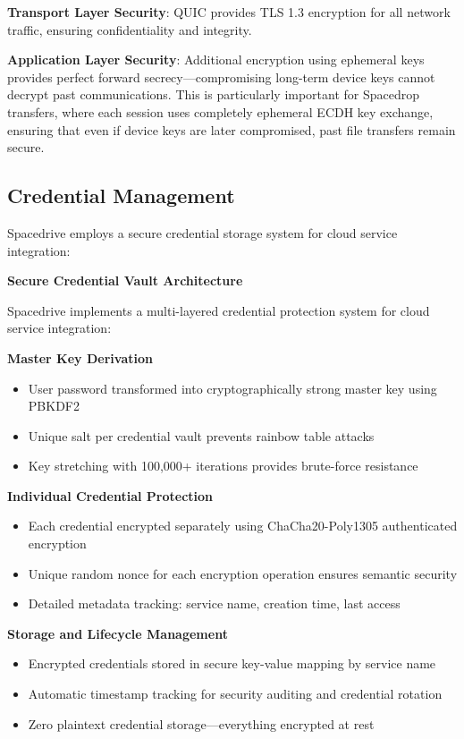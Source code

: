 \documentclass[sigconf]{acmart}
\begin{document}
\textbf{Transport Layer Security}: QUIC provides TLS 1.3 encryption for all network traffic, ensuring confidentiality and integrity.

\textbf{Application Layer Security}: Additional encryption using ephemeral keys provides perfect forward secrecy---compromising long-term device keys cannot decrypt past communications. This is particularly important for Spacedrop transfers, where each session uses completely ephemeral ECDH key exchange, ensuring that even if device keys are later compromised, past file transfers remain secure.

\subsection{Credential Management}
Spacedrive employs a secure credential storage system for cloud service integration:


\textbf{Secure Credential Vault Architecture}

Spacedrive implements a multi-layered credential protection system for cloud service integration:

\textbf{Master Key Derivation}
\begin{itemize}[noitemsep, topsep=0pt]
 \item User password transformed into cryptographically strong master key using PBKDF2
 \item Unique salt per credential vault prevents rainbow table attacks
 \item Key stretching with 100,000+ iterations provides brute-force resistance
\end{itemize}

\textbf{Individual Credential Protection}
\begin{itemize}[noitemsep, topsep=0pt]
 \item Each credential encrypted separately using ChaCha20-Poly1305 authenticated encryption
 \item Unique random nonce for each encryption operation ensures semantic security
 \item Detailed metadata tracking: service name, creation time, last access
\end{itemize}

\textbf{Storage and Lifecycle Management}
\begin{itemize}[noitemsep, topsep=0pt]
 \item Encrypted credentials stored in secure key-value mapping by service name
 \item Automatic timestamp tracking for security auditing and credential rotation
 \item Zero plaintext credential storage---everything encrypted at rest
\end{itemize}
\end{document}
